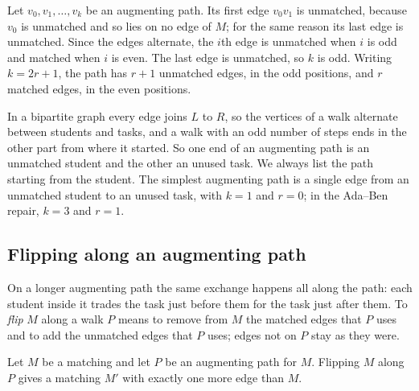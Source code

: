 Let $v_0,v_1,\ldots,v_k$ be an augmenting path. Its first edge $v_0v_1$ is unmatched, because $v_0$ is unmatched and so lies on no edge of $M$; for the same reason its last edge is unmatched. Since the edges alternate, the $i$th edge is unmatched when $i$ is odd and matched when $i$ is even. The last edge is unmatched, so $k$ is odd. Writing $k=2r+1$, the path has $r+1$ unmatched edges, in the odd positions, and $r$ matched edges, in the even positions.

In a bipartite graph every edge joins $L$ to $R$, so the vertices of a walk alternate between students and tasks, and a walk with an odd number of steps ends in the other part from where it started. So one end of an augmenting path is an unmatched student and the other an unused task. We always list the path starting from the student. The simplest augmenting path is a single edge from an unmatched student to an unused task, with $k=1$ and $r=0$; in the Ada--Ben repair, $k=3$ and $r=1$.


\subsection*{Flipping along an augmenting path}
On a longer augmenting path the same exchange happens all along the path: each student inside it trades the task just before them for the task just after them. To \emph{flip} $M$ along a walk $P$ means to remove from $M$ the matched edges that $P$ uses and to add the unmatched edges that $P$ uses; edges not on $P$ stay as they were.

\par\noindent\begin{minipage}{\linewidth}
\begin{lemma}\label{thm:augment}
Let $M$ be a matching and let $P$ be an augmenting path for $M$. Flipping $M$ along $P$ gives a matching $M'$ with exactly one more edge than $M$.
\end{lemma}
\end{minipage}\par

